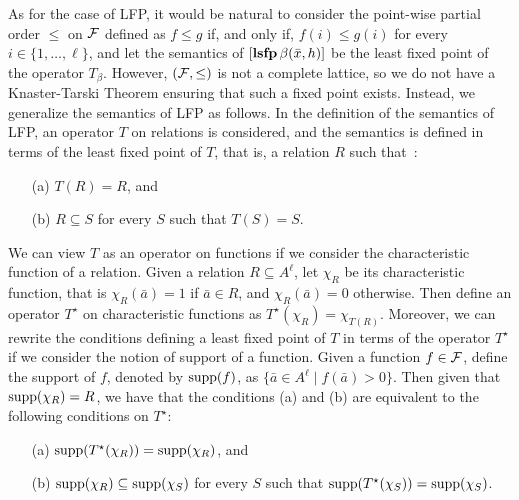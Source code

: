 As for the case of LFP, it would be natural to consider the point-wise partial order $\leq$ on $\F$ defined as $f \leq g$ if, and only if, $f(i) \leq g(i)$ for every $i \in \{1, \ldots, \ell\}$, and let the semantics of $[{\bf lsfp} \, \beta(\bar{x},h)]$ be the least fixed point of the operator $T_\beta$. However, $(\F, \leq)$ is not a complete lattice, so we do not have a Knaster-Tarski Theorem ensuring that such a fixed point exists. Instead, we generalize the semantics of LFP as follows. In the definition of the semantics of LFP, an operator $T$ on relations is considered, and the semantics is defined in terms of the least fixed point of $T$, that is, a relation $R$ such that~\cite{I86,vardi1982complexity}: 
\begin{enumerate}
 \item[(a)] $T(R) = R$, and 
 \item[(b)]  $R \subseteq S$ for every $S$ such that $T(S) = S$.  
\end{enumerate}
We can view $T$ as an operator on functions if we consider the characteristic function of a relation. Given a relation $R \subseteq A^\ell$, let $\chi_R$ be its characteristic function, that is $\chi_R(\bar a) = 1$ if $\bar a \in R$, and $\chi_R(\bar a) = 0$ otherwise. Then define an operator $T^\star$ on characteristic functions as $T^\star(\chi_R) = \chi_{T(R)}$. Moreover, we can rewrite the conditions defining a least fixed point of $T$ in terms of the operator $T^\star$ if we consider the notion of support of a function. Given a function $f \in \F$, define the support of $f$, denoted by $\text{\rm supp}(f)$, as $\{ \bar a \in A^\ell \mid f(\bar a) > 0 \}$. Then given that $\text{\rm supp}(\chi_R) = R$, we have that the conditions (a) and (b) are equivalent to the following conditions on $T^\star$:
\begin{enumerate}
	\item[(a)] $\text{\rm supp}(T^\star(\chi_R)) = \text{\rm supp}(\chi_R)$, and  
	\item[(b)] $\text{\rm supp}(\chi_R) \subseteq \text{\rm supp}(\chi_S)$ for every $S$ such that  $\text{\rm supp}(T^\star(\chi_{S})) = \text{\rm supp}(\chi_S)$.  
\end{enumerate}
